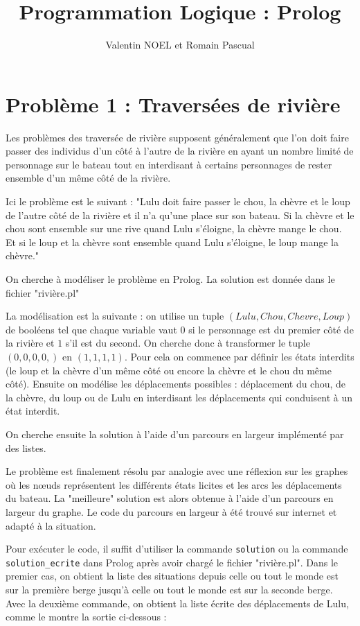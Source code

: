 \documentclass[12pt,a4paper]{article}
\title{Programmation Logique : Prolog}
\author{Valentin NOEL et Romain Pascual}
\begin{document}
\maketitle

\section{Problème 1 : Traversées de rivière}
Les problèmes des traversée de rivière supposent généralement que l'on doit faire passer des individus d'un côté à l'autre de la rivière en ayant un nombre limité de personnage sur le bateau tout en interdisant à certains personnages de rester ensemble d'un même côté de la rivière.

Ici le problème est le suivant : "Lulu doit faire passer le chou, la chèvre et le loup de l'autre côté de la rivière et il n'a qu'une place sur son bateau. Si la chèvre et le chou sont ensemble sur une rive quand Lulu s'éloigne, la chèvre mange le chou. Et si le loup et la chèvre sont ensemble quand Lulu s'éloigne, le loup mange la chèvre."

On cherche à modéliser le problème en Prolog. La solution est donnée dans le fichier "rivière.pl"

La modélisation est la suivante : on utilise un tuple $(Lulu, Chou, Chevre, Loup)$ de booléens tel que chaque variable vaut $0$ si le personnage est du premier côté de la rivière et $1$ s'il est du second. On cherche donc à transformer le tuple $(0,0,0,0,)$ en $(1,1,1,1)$. Pour cela on commence par définir les états interdits (le loup et la chèvre d'un même côté ou encore la chèvre et le chou du même côté). Ensuite on modélise les déplacements possibles : déplacement du chou, de la chèvre, du loup ou de Lulu en interdisant les déplacements qui conduisent à un état interdit.

On cherche ensuite la solution à l'aide d'un parcours en largeur implémenté par des listes.

Le problème est finalement résolu par analogie avec une réflexion sur les graphes où les nœuds représentent les différents états licites et les arcs les déplacements du bateau. La "meilleure" solution est alors obtenue à l'aide d'un parcours en largeur du graphe. Le code du parcours en largeur à été trouvé sur internet et adapté à la situation.

Pour exécuter le code, il suffit d'utiliser la commande \texttt{solution} ou la commande \texttt{solution\_ecrite} dans Prolog après avoir chargé le fichier "rivière.pl". Dans le premier cas, on obtient la liste des situations depuis celle ou tout le monde est sur la première berge jusqu'à celle ou tout le monde est sur la seconde berge. Avec la deuxième commande, on obtient la liste écrite des déplacements de Lulu, comme le montre la sortie ci-dessous :
\end{document}
